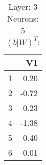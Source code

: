 \begin{table}[ht]
\centering
\begin{tabular}{rr}
  \hline
 & V1 \\ 
  \hline
1 & 0.20 \\ 
  2 & -0.72 \\ 
  3 & 0.23 \\ 
  4 & -1.38 \\ 
  5 & 0.40 \\ 
  6 & -0.01 \\ 
   \hline
\end{tabular}
\caption{Layer: 3 Neurons: 5  $(b|W)^T$: 
} 
\end{table}
